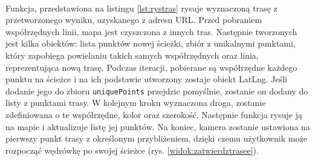 \noindent
\begin{minipage}{\linewidth}
    \label{lst:trasa}
    \centering
\end{minipage}
\\

Funkcja, przedstawiona na listingu \ref{lst:rystras} rysuje wyznaczoną trasę z przetworzonego wyniku, uzyskanego z adresu URL. Przed pobraniem współrzędnych linii, mapa jest czyszczona z innych tras. Następnie tworzonych jest kilka obiektów: lista punktów nowej ścieżki, zbiór z unikalnymi punktami, który zapobiega powielaniu takich samych współrzędnych oraz linia, reprezentująca nową trasę. Podczas iteracji, pobierane są współrzędne każdego punktu na ścieżce i na ich podstawie utworzony zostaje obiekt LatLng. Jeśli dodanie jego do zbioru \verb|uniquePoints| przejdzie pomyślnie, zostanie on dodany do listy z punktami trasy. W kolejnym kroku wyznaczona droga, zostanie zdefiniowana o te współrzędne, kolor oraz szerokość. Następnie funkcja rysuje ją na mapie i aktualizuje listę jej punktów. Na koniec, kamera zostanie ustawiona na pierwszy punkt trasy z określonym przybliżeniem, dzięki czemu użytkownik może rozpocząć wędrówkę po swojej ścieżce (rys. \ref{widok:zatwierdztrasee}).\\

